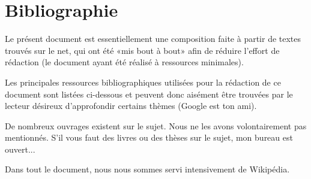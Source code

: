\documentclass[11pt,pdflatex]{book}
\begin{document}
\ifVersionDuDocEstVincent
   \chapter*{Bibliographie}

 Le présent document est essentiellement une composition faite à partir de textes trouvés sur le net, qui ont été «mis bout à bout» afin de réduire l'effort  de rédaction (le document ayant été réalisé à ressources minimales).

 Les principales  ressources bibliographiques utilisées pour la rédaction de ce document  sont listées ci-dessous et peuvent donc aisément être trouvées par le lecteur désireux d'approfondir certains thèmes (Google est ton ami).

 De nombreux ouvrages existent sur le sujet. Nous ne les avons volontairement pas  mentionnés. S'il vous faut des livres ou des thèses sur le sujet, mon bureau est  ouvert...

 Dans tout le document, nous nous sommes servi intensivement de Wikipédia.
 
   \printbibliography[keyword=0,title={Références générales}]
   \ifAuteursDansGallerie{}\fi

   \printbibliography[keyword=1,title={Références de la partie 1}]
   \ifAuteursDansGallerie{}\fi

   \printbibliography[keyword=2,title={Références de la partie 2}]
   \ifAuteursDansGallerie{}\fi
\end{document}
